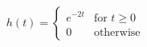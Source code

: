 \documentclass[preview]{standalone}
\begin{document}
\begin{align*}
h(t) = \begin{cases} e^{-2t} & \text{for } t \geq 0 \\ 0 & \text{otherwise} \end{cases}
\end{align*}
\end{document}
